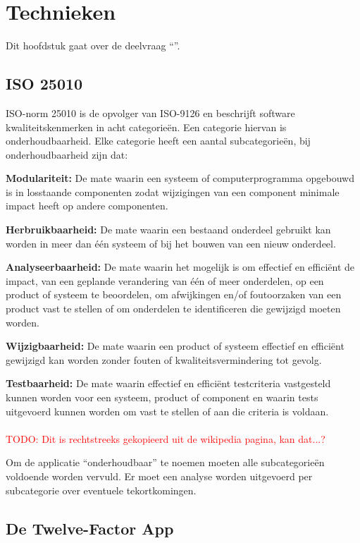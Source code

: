 \chapter{Technieken}

\label{Chapter3}

Dit hoofdstuk gaat over de deelvraag \enquote{\deeltechnieken}.

\section{ISO 25010}

ISO-norm 25010 \parencite{ISO25010} is de opvolger van ISO-9126 en beschrijft software kwaliteitskenmerken in acht categorieën. Een categorie hiervan is onderhoudbaarheid. Elke categorie heeft een aantal subcategorieën, bij onderhoudbaarheid zijn dat:

\textbf{Modulariteit:} De mate waarin een systeem of computerprogramma opgebouwd is in losstaande componenten zodat wijzigingen van een component minimale impact heeft op andere componenten.

\textbf{Herbruikbaarheid:} De mate waarin een bestaand onderdeel gebruikt kan worden in meer dan één systeem of bij het bouwen van een nieuw onderdeel.

\textbf{Analyseerbaarheid:} De mate waarin het mogelijk is om effectief en efficiënt de impact, van een geplande verandering van één of meer onderdelen, op een product of systeem te beoordelen, om afwijkingen en/of foutoorzaken van een product vast te stellen of om onderdelen te identificeren die gewijzigd moeten worden.

\textbf{Wijzigbaarheid:} De mate waarin een product of systeem effectief en efficiënt gewijzigd kan worden zonder fouten of kwaliteitsvermindering tot gevolg.

\textbf{Testbaarheid:} De mate waarin effectief en efficiënt testcriteria vastgesteld kunnen worden voor een systeem, product of component en waarin tests uitgevoerd kunnen worden om vast te stellen of aan die criteria is voldaan.
\\\\
\textcolor{red}{TODO: Dit is rechtstreeks gekopieerd uit de wikipedia pagina, kan dat...?} %

Om de applicatie \enquote{onderhoudbaar} te noemen moeten alle subcategorieën voldoende worden vervuld. Er moet een analyse worden uitgevoerd per subcategorie over eventuele tekortkomingen.


\section{De Twelve-Factor App}

